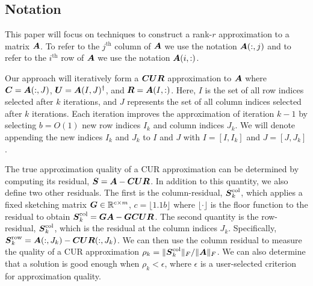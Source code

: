 
\subsection{Notation}\label{sec:not}
This paper will focus on techniques to construct a rank-$r$ approximation to a matrix $\boldsymbol{A}$. To refer to the $j^{\text{th}}$ column of $\boldsymbol{A}$ we use the notation $\boldsymbol{A}(:, j)$ and to refer to the $i^{\text{th}}$  row of $\boldsymbol{A}$ we use the notation $\boldsymbol{A}(i,:)$. 

Our approach will iteratively form a $\boldsymbol{C} \boldsymbol{U} \boldsymbol{R}$ approximation to $\boldsymbol{A}$ where $\boldsymbol{C} = \boldsymbol{A}(:, J)$, $\boldsymbol{U} = \boldsymbol{A}(I, J)^\dagger$, and $\boldsymbol{R} = \boldsymbol{A}(I, :)$. Here, $I$ is the set of all row indices selected after $k$ iterations, and $J$ represents the set of all column indices selected after $k$ iterations.  Each iteration improves the approximation of iteration $k-1$ by selecting $b=O(1)$ new row indices $I_k$ and column indices $J_k$. We will denote appending the new indices $I_k$ and $J_k$ to $I$ and $J$ with $I = [I, I_k]$ and $J = [J, J_k]$.

The true approximation quality of a CUR approximation can be determined by computing its residual, $\boldsymbol{S} = \boldsymbol{A}- \boldsymbol{C} \boldsymbol{U} \boldsymbol{R}$. In addition to this quantity, we also define two other residuals. The first is the column-residual, $\boldsymbol{S}_{k}^{\rm col}$, which applies a fixed sketching matrix $\boldsymbol{G} \in \mathbb{R}^{c \times m}$, $c = \lfloor 1.1b \rfloor$ where $\lfloor \cdot \rfloor$ is the floor function to the residual to obtain $\boldsymbol{S}_{k}^{\rm col} = \boldsymbol{G} \boldsymbol{A} - \boldsymbol{G} \boldsymbol{C} \boldsymbol{U} \boldsymbol{R}$. The second quantity is the row-residual, $\boldsymbol{S}_{k}^{\rm col}$,  which is the residual at the column indices $J_k$. Specifically, $\boldsymbol{S}_{k}^{\rm row} = \boldsymbol{A}(:, J_k) - \boldsymbol{C} \boldsymbol{U} \boldsymbol{R}(:, J_k)$. We can then use the column residual to measure the quality of a CUR approximation $\rho_k = \|\boldsymbol{S}_{k}^{\rm col}\|_F/\|\boldsymbol{A}\|_F$. We can also determine that a solution is good enough when $\rho_k < \epsilon$, where $\epsilon$ is a user-selected criterion for approximation quality.
